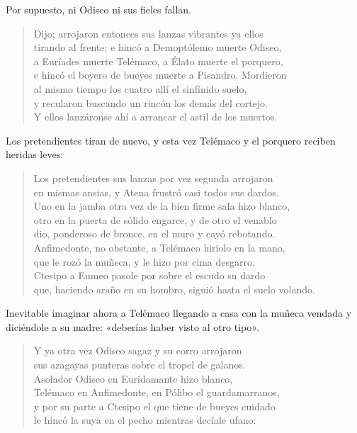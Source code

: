 Por supuesto, ni Odiseo ni sus fieles fallan.

\begin{verse}
Dijo; arrojaron entonces sus lanzas vibrantes ya ellos\\
tirando al frente; e hincó a Demoptólemo muerte Odiseo,\\
a Euríades muerte Telémaco, a Élato muerte el porquero,\\
e hincó el boyero de bueyes muerte a Pisandro. Mordieron\\
al mismo tiempo los cuatro allí el sinfínido suelo,\\
y recularon buscando un rincón los demás del cortejo.\\
Y ellos lanzáronse ahí a arrancar el astil de los muertos.
\end{verse}

Los pretendientes tiran de nuevo, y esta vez Telémaco y el porquero reciben heridas leves:

\begin{verse}
Los pretendientes sus lanzas por vez segunda arrojaron\\
en mismas ansias, y Atena frustró casi todos sus dardos.\\
Uno en la jamba otra vez de la bien firme sala hizo blanco,\\
otro en la puerta de sólido engarce, y de otro el venablo\\
dio, ponderoso de bronce, en el muro y cayó rebotando.\\
Anfimedonte, no obstante, a Telémaco hiriolo en la mano,\\
que le rozó la muñeca, y le hizo por cima desgarro.\\
Ctesipo a Eumeo pasole por sobre el escudo su dardo\\
que, haciendo araño en su hombro, siguió hasta el suelo volando.
\end{verse}

Inevitable imaginar ahora a Telémaco llegando a casa con la muñeca vendada y diciéndole a su madre: «deberías haber visto al otro tipo».

\begin{verse}
Y ya otra vez Odiseo sagaz y su corro arrojaron\\
sus azagayas punteras sobre el tropel de galanos.\\
Asolador Odiseo en Euridamante hizo blanco,\\
Telémaco en Anfimedonte, en Pólibo el guardamarranos,\\
y por su parte a Ctesipo el que tiene de bueyes cuidado\\
le hincó la suya en el pecho mientras decíale ufano:
\end{verse}

